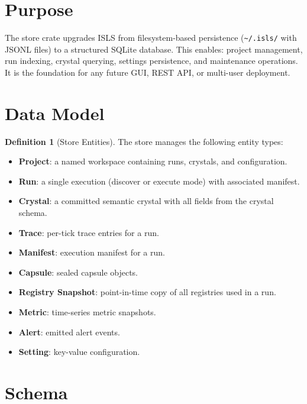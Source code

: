\documentclass[11pt,a4paper,twoside]{article}
\theoremstyle{definition}
\newtheorem{definition}{Definition}[section]
\theoremstyle{plain}
\theoremstyle{remark}
\newcommand{\ISLS}{\textsf{ISLS}}
\begin{document}
\section{Purpose}\label{sec:store:purpose}

The store crate upgrades \ISLS{} from filesystem-based persistence
(\texttt{\~{}/.isls/} with JSONL files) to a structured SQLite database.
This enables: project management, run indexing, crystal querying,
settings persistence, and maintenance operations. It is the foundation
for any future GUI, REST API, or multi-user deployment.

\section{Data Model}\label{sec:store:model}

\begin{definition}[Store Entities]\label{def:storeentities}
The store manages the following entity types:
\begin{itemize}[nosep]
  \item \textbf{Project}: a named workspace containing runs, crystals,
        and configuration.
  \item \textbf{Run}: a single execution (discover or execute mode)
        with associated manifest.
  \item \textbf{Crystal}: a committed semantic crystal with all fields
        from the crystal schema.
  \item \textbf{Trace}: per-tick trace entries for a run.
  \item \textbf{Manifest}: execution manifest for a run.
  \item \textbf{Capsule}: sealed capsule objects.
  \item \textbf{Registry Snapshot}: point-in-time copy of all
        registries used in a run.
  \item \textbf{Metric}: time-series metric snapshots.
  \item \textbf{Alert}: emitted alert events.
  \item \textbf{Setting}: key-value configuration.
\end{itemize}
\end{definition}

\section{Schema}\label{sec:store:schema}
\end{document}
